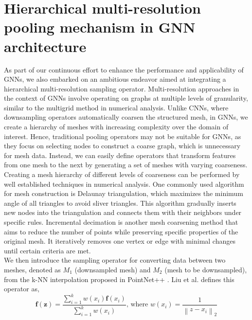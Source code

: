 \section{Hierarchical multi-resolution pooling mechanism in GNN architecture}
As part of our continuous effort to enhance the performance and applicability of GNNs, we also embarked on an ambitious endeavor aimed at integrating a hierarchical multi-resolution sampling operator. Multi-resolution approaches in the context of GNNs involve operating on graphs at multiple levels of granularity, similar to the multigrid method in numerical analysis. Unlike CNNs, where downsampling operators automatically coarsen the structured mesh, in GNNs, we create a hierarchy of meshes with increasing complexity over the domain of interest. Hence, traditional pooling operators may not be suitable for GNNs, as they focus on selecting nodes to construct a coarse graph, which is unnecessary for mesh data. Instead, we can easily define operators that transform features from one mesh to the next by generating a set of meshes with varying coarseness.\\
Creating a mesh hierarchy of different levels of coarseness can be performed by well established techniques in numerical analysis. One commonly used algorithm for mesh construction is Delaunay triangulation, which maximizes the minimum angle of all triangles to avoid sliver triangles. This algorithm gradually inserts new nodes into the triangulation and connects them with their neighbors under specific rules. Incremental decimation is another mesh coarsening method that aims to reduce the number of points while preserving specific properties of the original mesh. It iteratively removes one vertex or edge with minimal changes until certain criteria are met. \\
We then introduce the sampling operator for converting data between two meshes, denoted as $M_1$ (downsampled mesh) and $M_2$ (mesh to be downsampled), from the k-NN interpolation proposed in PointNet++ \cite{pnpp}. Liu et al. \cite{metalearning} defines this operator as,
\begin{equation}
    \mathbf{f}(\mathbf{z})=\frac{\sum_{i=1}^k w\left(x_i\right) \mathbf{f}\left(x_i\right)}{\sum_{i=1}^k w\left(x_i\right)} \text {, where } w\left(x_i\right)=\frac{1}{\left\|z-x_i\right\|_2}
    \end{equation}
